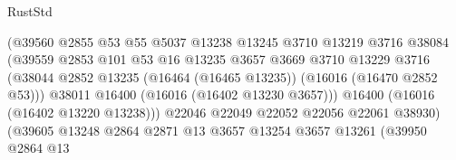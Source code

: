\begin{lexlean}{RustStd}
\begin{coremodule}
                                          (@39560
                                            @2855
                                            @53
                                            @55
                                            @5037
                                            @13238
                                            @13245
                                            @3710
                                            @13219
                                            @3716
                                            @38084
                                            (@39559
                                              @2853
                                              @101
                                              @53
                                              @16
                                              @13235
                                              @3657
                                              @3669
                                              @3710
                                              @13229
                                              @3716
                                              (@38044
                                                @2852
                                                @13235
                                                (@16464 (@16465 @13235))
                                                (@16016 (@16470 @2852 @53)))
                                              @38011
                                              @16400
                                              (@16016 (@16402 @13230 @3657)))
                                            @16400
                                            (@16016 (@16402 @13220 @13238)))
                                          @22046
                                          @22049
                                          @22052
                                          @22056
                                          @22061
                                          @38930)
                                        (@39605
                                          @13248
                                          @2864
                                          @2871
                                          @13
                                          @3657
                                          @13254
                                          @3657
                                          @13261
                                          (@39950
                                            @2864
                                            @13

\end{coremodule}
\end{lexlean}
